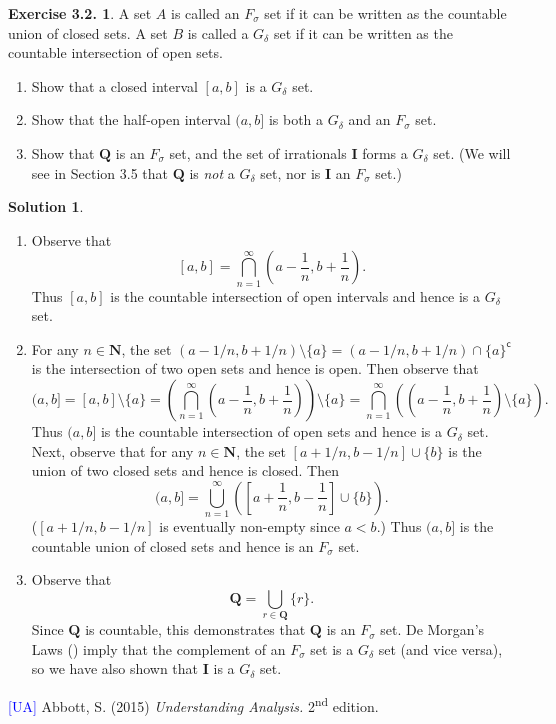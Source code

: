 \documentclass[12pt]{article}
\theoremstyle{definition}
\theoremstyle{exercise}
\newtheorem{exercise}{Exercise 3.2.}
\theoremstyle{solution}
\newtheorem*{solution}{Solution}
\newcommand{\ts}{\textsuperscript}
\newcommand{\setcomp}[1]{#1^{\mathsf{c}}}
\newcommand{\N}{\mathbf{N}}
\newcommand{\Q}{\mathbf{Q}}
\newcommand{\I}{\mathbf{I}}
\begin{document}
\begin{exercise}
\label{ex:15}
    A set \( A \) is called an \( F_{\sigma} \) set if it can be written as the countable union of closed sets. A set \( B \) is called a \( G_{\delta} \) set if it can be written as the countable intersection of open sets.
    \begin{enumerate}
        \item Show that a closed interval \( [a, b] \) is a \( G_{\delta} \) set.

        \item Show that the half-open interval \( (a, b] \) is both a \( G_{\delta} \) and an \( F_{\sigma} \) set.

        \item Show that \( \Q \) is an \( F_{\sigma} \) set, and the set of irrationals \( \I \) forms a \( G_{\delta} \) set. (We will see in Section 3.5 that \( \Q \) is \textit{not} a \( G_{\delta} \) set, nor is \( \I \) an \( F_{\sigma} \) set.)
    \end{enumerate}
\end{exercise}

\begin{solution}
    \begin{enumerate}
        \item Observe that
        \[
            [a, b] = \bigcap_{n=1}^{\infty} \left( a - \frac{1}{n}, b + \frac{1}{n} \right).
        \]
        Thus \( [a, b] \) is the countable intersection of open intervals and hence is a \( G_{\delta} \) set.

        \item For any \( n \in \N \), the set \( (a - 1/n, b + 1/n) \setminus \{ a \} = (a - 1/n, b + 1/n) \cap \setcomp{\{ a \}} \) is the intersection of two open sets and hence is open. Then observe that
        \[
            (a, b] = [a, b] \setminus \{ a \} = \left( \bigcap_{n=1}^{\infty} \left( a - \frac{1}{n}, b + \frac{1}{n} \right) \right) \setminus \{ a \} = \bigcap_{n=1}^{\infty} \left( \left( a - \frac{1}{n}, b + \frac{1}{n} \right) \setminus \{ a \} \right).
        \]
        Thus \( (a, b] \) is the countable intersection of open sets and hence is a \( G_{\delta} \) set. Next, observe that for any \( n \in \N \), the set \( [a + 1/n, b - 1/n] \cup \{ b \} \) is the union of two closed sets and hence is closed. Then
        \[
            (a, b] = \bigcup_{n=1}^{\infty} \left( \left[ a + \frac{1}{n}, b - \frac{1}{n} \right] \cup \{ b \} \right).
        \]
        (\( [a + 1/n, b - 1/n] \) is eventually non-empty since \( a < b \).) Thus \( (a, b] \) is the countable union of closed sets and hence is an \( F_{\sigma} \) set.

        \item Observe that
        \[
            \Q = \bigcup_{r \in \Q} \{ r \}.
        \]
        Since \( \Q \) is countable, this demonstrates that \( \Q \) is an \( F_{\sigma} \) set. De Morgan's Laws () imply that the complement of an \( F_{\sigma} \) set is a \( G_{\delta} \) set (and vice versa), so we have also shown that \( \I \) is a \( G_{\delta} \) set.
    \end{enumerate}
\end{solution}

\noindent \hrulefill

\noindent \hypertarget{ua}{\textcolor{blue}{[UA]} Abbott, S. (2015) \textit{Understanding Analysis.} 2\ts{nd} edition.}
\end{document}
